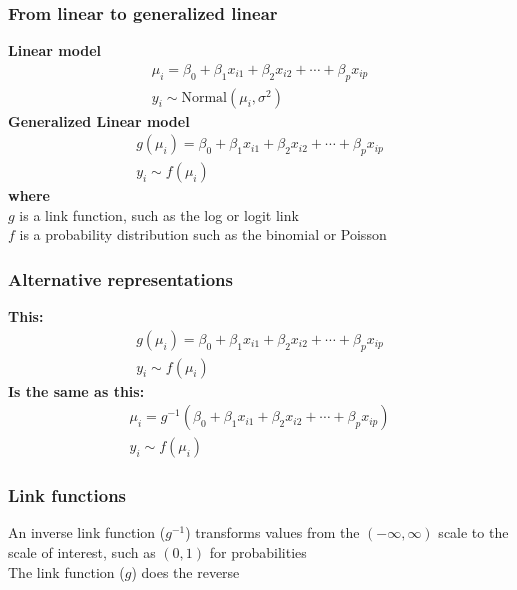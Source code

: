 \documentclass[color=usenames,dvipsnames]{beamer}\usepackage[]{graphicx}\usepackage[]{color}
\begin{document}
\begin{frame}
  \frametitle{From linear to generalized linear}
  {\bf Linear model}
  \begin{gather*}
    \mu_i = \beta_0 + \beta_1 x_{i1} + \beta_2 x_{i2} + \cdots + \beta_p x_{ip} \\
    y_i \sim \mathrm{Normal}(\mu_i, \sigma^2)
  \end{gather*}
  \pause
  \vfill
  {\bf Generalized Linear model}
  \begin{gather*}
    g(\mu_i) = \beta_0 + \beta_1 x_{i1} + \beta_2 x_{i2} + \cdots + \beta_p x_{ip} \\
    y_i \sim f(\mu_i)
  \end{gather*}
  \pause
  {\bf where} \\
  $g$ is a link function, such as the log or logit link \\
  \pause
  $f$ is a probability distribution such as the binomial or Poisson
\end{frame}


\begin{frame}
  \frametitle{Alternative representations}
  {\bf This:}
  \begin{gather*}
    g(\mu_i) = \beta_0 + \beta_1 x_{i1} + \beta_2 x_{i2} + \cdots + \beta_p x_{ip} \\
    y_i \sim f(\mu_i)
  \end{gather*}
  \pause
  {\bf Is the same as this:}
  \begin{gather*}
    \mu_i = g^{-1}(\beta_0 + \beta_1 x_{i1} + \beta_2 x_{i2} + \cdots + \beta_p x_{ip}) \\
    y_i \sim f(\mu_i)
  \end{gather*}
\end{frame}


\begin{frame}
  \frametitle{Link functions}
  An inverse link function ($g^{-1}$) transforms values from the $(-\infty,\infty)$
  scale to the scale of interest, such as $(0,1)$ for probabilities  \\
  \pause
  \vfill
  The link function ($g$) does the reverse \\
\end{frame}
\end{document}
